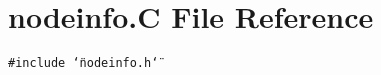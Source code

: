 \section{nodeinfo.C File Reference}
\label{nodeinfo_8C}
{\tt \#include \char`\"{}nodeinfo.h\char`\"{}}\par
